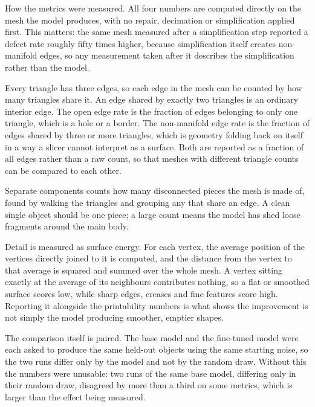 \documentclass[11pt,a4paper]{article}
\begin{document}
How the metrics were measured. All four numbers are computed directly on the mesh the model produces, with no repair, decimation or simplification applied first. This matters: the same mesh measured after a simplification step reported a defect rate roughly fifty times higher, because simplification itself creates non-manifold edges, so any measurement taken after it describes the simplification rather than the model.

Every triangle has three edges, so each edge in the mesh can be counted by how many triangles share it. An edge shared by exactly two triangles is an ordinary interior edge. The open edge rate is the fraction of edges belonging to only one triangle, which is a hole or a border. The non-manifold edge rate is the fraction of edges shared by three or more triangles, which is geometry folding back on itself in a way a slicer cannot interpret as a surface. Both are reported as a fraction of all edges rather than a raw count, so that meshes with different triangle counts can be compared to each other.

Separate components counts how many disconnected pieces the mesh is made of, found by walking the triangles and grouping any that share an edge. A clean single object should be one piece; a large count means the model has shed loose fragments around the main body.

Detail is measured as surface energy. For each vertex, the average position of the vertices directly joined to it is computed, and the distance from the vertex to that average is squared and summed over the whole mesh. A vertex sitting exactly at the average of its neighbours contributes nothing, so a flat or smoothed surface scores low, while sharp edges, creases and fine features score high. Reporting it alongside the printability numbers is what shows the improvement is not simply the model producing smoother, emptier shapes.

The comparison itself is paired. The base model and the fine-tuned model were each asked to produce the same held-out objects using the same starting noise, so the two runs differ only by the model and not by the random draw. Without this the numbers were unusable: two runs of the same base model, differing only in their random draw, disagreed by more than a third on some metrics, which is larger than the effect being measured.
\end{document}
